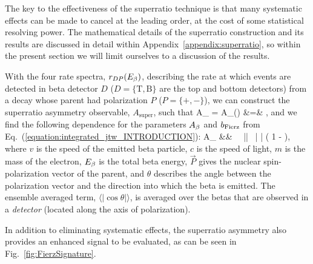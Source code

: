 The key to the effectiveness of the superratio technique is that many systematic effects can be made to cancel at the leading order, at the cost of some statistical resolving power.  The mathematical details of the superratio construction and its results are discussed in detail within Appendix~\ref{appendix:superratio}, so within the present section we will limit ourselves to a discussion of the results.

With the four rate spectra, $r_{D P}(E_{\beta})$, describing the rate at which events are detected in beta detector $D$ ($D =\{ \mathrm{T, B}  \}$ are the top and bottom detectors) from a decay whose parent had polarization $P$ ($P=\{+,-\}$), we can construct the superratio asymmetry observable, $A_{\mathrm{super}}$, such that
\bea
A_{} \;\;=\;\; A_{}(\Ebeta) 
&=& ,
\eea
and we find the following dependence for the parameters $A_{\beta}$ and $b_{\mathrm{Fierz}}$ from Eq.~(\ref{equation:integrated_jtw_INTRODUCTION}):
\bea
A_{} &\approx& \Abeta \,  \, || \, \langle | \cos\theta | \rangle \left( 1 - \bFierz {} \right), 
\eea
where $v$ is the speed of the emitted beta particle, $c$ is the speed of light, $m$ is the mass of the electron, $E_{\beta}$ is the total beta energy, $\vec{P}$ gives the nuclear spin-polarization vector of the parent, and $\theta$ describes the angle between the polarization vector and the direction into which the beta is emitted.  The ensemble averaged term, $\langle | \cos\theta | \rangle$, is averaged over the betas that are observed in a \emph{detector} (located along the axis of polarization).

In addition to eliminating systematic effects, the superratio asymmetry also provides an enhanced signal to be evaluated, as can be seen in Fig.~\ref{fig:FierzSignature}.

